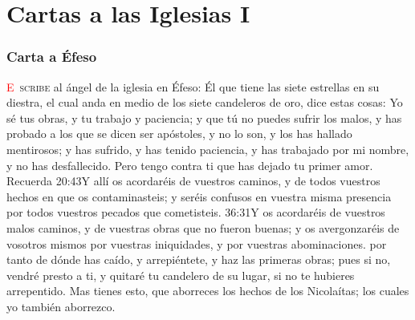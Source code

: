 \chapter{Cartas a las Iglesias I}
\subsection*{Carta a Éfeso}
\lettrine[lines=3]{\textcolor{red}{E}}{\ scribe} al ángel de la iglesia en Éfeso: 
\zz Él que tiene las siete estrellas en su diestra, el cual anda en medio de los siete candeleros de oro, dice estas cosas:%
Yo sé tus obras, y tu trabajo y paciencia; y que tú no puedes sufrir los malos, y has probado a los que se dicen ser apóstoles, y no lo son, y los has hallado mentirosos; %
y has sufrido, y has tenido paciencia, y has trabajado por mi nombre, y no has desfallecido. %
Pero tengo contra ti que has dejado tu primer amor.%
Recuerda%
				{20:43}{Y allí os acordaréis de vuestros caminos, y de todos vuestros hechos en que os contaminasteis; y seréis confusos en vuestra misma presencia por todos vuestros pecados que cometisteis.}%
				{36:31}{Y os acordaréis de vuestros malos caminos, y de vuestras obras que no fueron buenas; y os avergonzaréis de vosotros mismos por vuestras iniquidades, y por vuestras abominaciones.} %
por tanto de dónde has caído, y arrepiéntete, y haz las primeras obras; pues si no, vendré presto a ti, y quitaré tu candelero de su lugar, si no te hubieres arrepentido. %
Mas tienes esto, que aborreces los hechos de los Nicolaítas; los cuales yo también aborrezco.%

